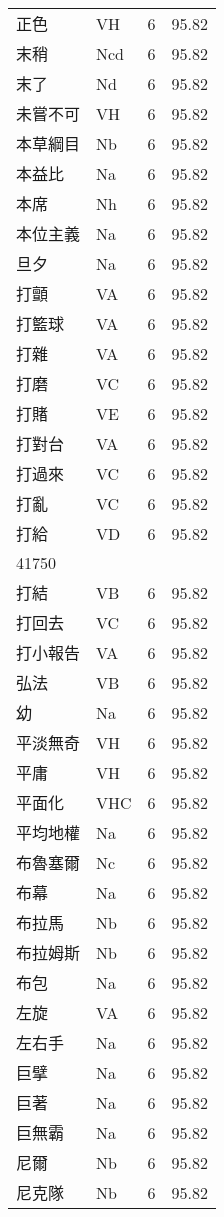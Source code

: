 \documentclass[twocolumn]{book}
\begin{document}
\begin{supertabular}{llrr}
正色 & VH & 6 &  95.82\\
末稍 & Ncd & 6 &  95.82\\
末了 & Nd & 6 &  95.82\\
未嘗不可 & VH & 6 &  95.82\\
本草綱目 & Nb & 6 &  95.82\\
本益比 & Na & 6 &  95.82\\
本席 & Nh & 6 &  95.82\\
本位主義 & Na & 6 &  95.82\\
旦夕 & Na & 6 &  95.82\\
打顫 & VA & 6 &  95.82\\
打籃球 & VA & 6 &  95.82\\
打雜 & VA & 6 &  95.82\\
打磨 & VC & 6 &  95.82\\
打賭 & VE & 6 &  95.82\\
打對台 & VA & 6 &  95.82\\
打過來 & VC & 6 &  95.82\\
打亂 & VC & 6 &  95.82\\
打給 & VD & 6 &  95.82\\
41750\\
打結 & VB & 6 &  95.82\\
打回去 & VC & 6 &  95.82\\
打小報告 & VA & 6 &  95.82\\
弘法 & VB & 6 &  95.82\\
幼 & Na & 6 &  95.82\\
平淡無奇 & VH & 6 &  95.82\\
平庸 & VH & 6 &  95.82\\
平面化 & VHC & 6 &  95.82\\
平均地權 & Na & 6 &  95.82\\
布魯塞爾 & Nc & 6 &  95.82\\
布幕 & Na & 6 &  95.82\\
布拉馬 & Nb & 6 &  95.82\\
布拉姆斯 & Nb & 6 &  95.82\\
布包 & Na & 6 &  95.82\\
左旋 & VA & 6 &  95.82\\
左右手 & Na & 6 &  95.82\\
巨擘 & Na & 6 &  95.82\\
巨著 & Na & 6 &  95.82\\
巨無霸 & Na & 6 &  95.82\\
尼爾 & Nb & 6 &  95.82\\
尼克隊 & Nb & 6 &  95.82\\

\end{supertabular}
\end{document}
